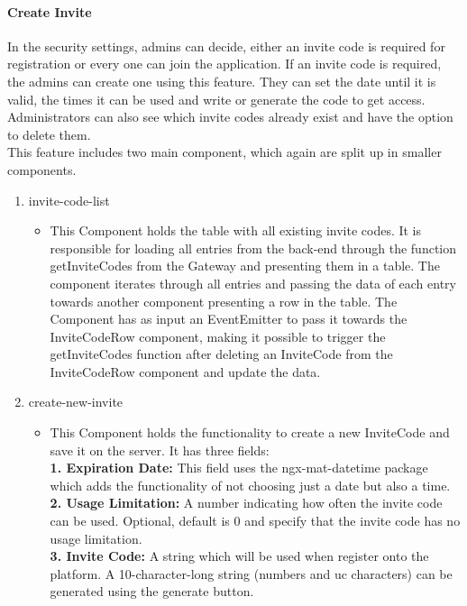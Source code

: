 \paragraph{Create Invite}
In the security settings, admins can decide, either an invite code is required for registration or every one can join
the application.
If an invite code is required, the admins can create one using this feature.
They can set the date until it is valid, the times it can be used and write or generate the code to get access.
Administrators can also see which invite codes already exist and have the option to delete them.\\
This feature includes two main component, which again are split up in smaller components.

\begin{enumerate}
    \item invite-code-list
    \begin{itemize}
        \item This Component holds the table with all existing invite codes.
        It is responsible for loading all entries from the back-end through the function getInviteCodes from the
        Gateway and presenting them in a table.
        The component iterates through all entries and passing the data of each entry towards another component
        presenting a row in the table.
        The Component has as input an EventEmitter to pass it towards the InviteCodeRow component, making it possible
        to trigger the getInviteCodes function after deleting an InviteCode from the InviteCodeRow component and update
        the data.
    \end{itemize}
    \item create-new-invite
    \begin{itemize}
        \item This Component holds the functionality to create a new InviteCode and save it on the server.
        It has three fields:\\
        \textbf{1.	Expiration Date:} This field uses the ngx-mat-datetime package which adds the functionality of not
        choosing just a date but also a time. \\
        \textbf{2.	Usage Limitation:} A number indicating how often the invite code can be used.
        Optional, default is 0 and specify that the invite code has no usage limitation. \\
        \textbf{3.	Invite Code:} A string which will be used when register onto the platform.
        A 10-character-long string (numbers and uc characters) can be generated using the generate button.\\
    \end{itemize}
\end{enumerate}

